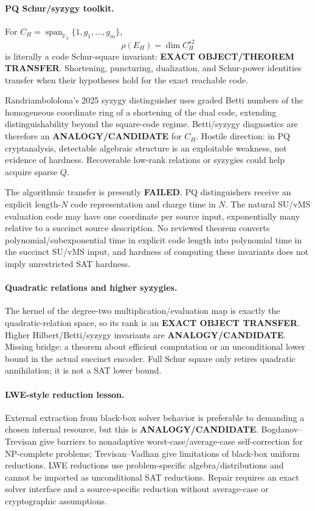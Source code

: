 \documentclass[11pt]{article}
\begin{document}
\paragraph{PQ Schur/syzygy toolkit.}
For $C_H=\operatorname{span}_{\mathbb F_2}\{1,g_1,\ldots,g_m\}$,
\[
\rho(E_H)=\dim C_H^{\star2}
\]
is literally a code Schur-square invariant: \textbf{EXACT OBJECT/THEOREM TRANSFER}. Shortening, puncturing, dualization, and Schur-power identities transfer when their hypotheses hold for the exact reachable code.

Randriambololona's 2025 syzygy distinguisher uses graded Betti numbers of the homogeneous coordinate ring of a shortening of the dual code, extending distinguishability beyond the square-code regime. Betti/syzygy diagnostics are therefore an \textbf{ANALOGY/CANDIDATE} for $C_H$. Hostile direction: in PQ cryptanalysis, detectable algebraic structure is an exploitable weakness, not evidence of hardness. Recoverable low-rank relations or syzygies could help acquire sparse $Q$.

The algorithmic transfer is presently \textbf{FAILED}. PQ distinguishers receive an explicit length-$N$ code representation and charge time in $N$. The natural SU/vMS evaluation code may have one coordinate per source input, exponentially many relative to a succinct source description. No reviewed theorem converts polynomial/subexponential time in explicit code length into polynomial time in the succinct SU/vMS input, and hardness of computing these invariants does not imply unrestricted SAT hardness.

\paragraph{Quadratic relations and higher syzygies.}
The kernel of the degree-two multiplication/evaluation map is exactly the quadratic-relation space, so its rank is an \textbf{EXACT OBJECT TRANSFER}. Higher Hilbert/Betti/syzygy invariants are \textbf{ANALOGY/CANDIDATE}. Missing bridge: a theorem about efficient computation or an unconditional lower bound in the actual succinct encoder. Full Schur square only retires quadratic annihilation; it is not a SAT lower bound.

\paragraph{LWE-style reduction lesson.}
External extraction from black-box solver behavior is preferable to demanding a chosen internal resource, but this is \textbf{ANALOGY/CANDIDATE}. Bogdanov--Trevisan give barriers to nonadaptive worst-case/average-case self-correction for NP-complete problems; Trevisan--Vadhan give limitations of black-box uniform reductions. LWE reductions use problem-specific algebra/distributions and cannot be imported as unconditional SAT reductions. Repair requires an exact solver interface and a source-specific reduction without average-case or cryptographic assumptions.
\end{document}
